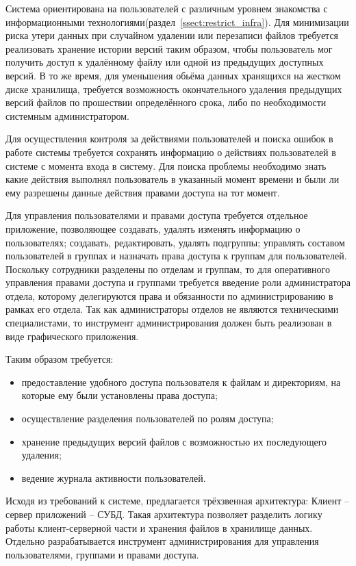 \documentclass[utf8,usehyperref,12pt]{G7-32}
\begin{document}
Система ориентирована на пользователей с различным уровнем знакомства с информационными технологиями(раздел~\ref{ssect:restrict_infra}). Для минимизации риска утери данных при случайном удалении или перезаписи файлов требуется реализовать хранение истории версий таким образом, чтобы пользователь мог получить доступ к удалённому файлу или одной из предыдущих доступных версий. В то же время, для уменьшения обьёма данных хранящихся на жестком диске хранилища, требуется возможность окончательного удаления предыдущих версий файлов по прошествии определённого срока, либо по необходимости системным администратором.

Для осуществления контроля за действиями пользователей и поиска ошибок в работе системы требуется сохранять информацию о действиях пользователей в системе с момента входа в систему. Для поиска проблемы необходимо знать какие действия выполнял пользователь в указанный момент времени и были ли ему разрешены данные действия правами доступа на тот момент.

Для управления пользователями и правами доступа требуется отдельное приложение, позволяющее создавать, удалять изменять информацию о пользователях; создавать, редактировать, удалять подгруппы; управлять составом пользователей в группах и назначать права доступа к группам для пользователей. Поскольку сотрудники разделены по отделам и группам, то для оперативного управления правами доступа и группами требуется введение роли администратора отдела, которому делегируются права и обязанности по администрированию в рамках его отдела. Так как администраторы отделов не являются техническими специалистами, то инструмент администрирования должен быть реализован в виде графического приложения.

Таким образом требуется:
\begin{itemize}
\item предоставление удобного доступа пользователя к файлам и директориям, на которые ему были установлены права доступа;
\item осуществление разделения пользователей по ролям доступа;
\item хранение предыдущих версий файлов с возможностью их последующего удаления;
\item ведение журнала активности пользователей.
\end{itemize}

Исходя из требований к системе, предлагается трёхзвенная архитектура: Клиент -- сервер приложений -- СУБД. Такая архитектура позволяет разделить логику работы клиент-серверной части и хранения файлов в хранилище данных. Отдельно разрабатывается инструмент администрирования для управления пользователями, группами и правами доступа.
\end{document}
